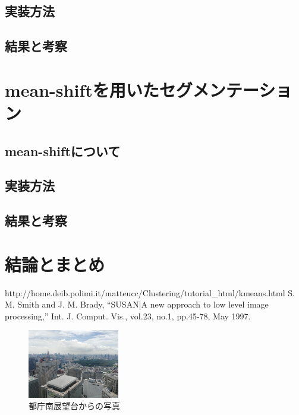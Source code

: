 \documentclass[11pt,a4j]{jsarticle}
\begin{document}
    \subsection{実装方法}
    \subsection{結果と考察}

    \section{mean-shiftを用いたセグメンテーション}
    \subsection{mean-shiftについて}
    \subsection{実装方法}
    \subsection{結果と考察}

    \section{結論とまとめ}

    \begin{thebibliography}{9}
         http://home.deib.polimi.it/matteucc/Clustering/tutorial_html/kmeans.html
         S. M. Smith and J. M. Brady,
          ``SUSAN|A new approach to low level image processing,'' Int. J. Comput.
          Vis., vol.23, no.1, pp.45-78, May 1997.
      \end{thebibliography}

    \begin{figure}[H]
      \centering
      \includegraphics[clip,width=4.0cm]{img/metro.jpg}
      \caption{都庁南展望台からの写真\label{fig:cute}}
    \end{figure}
\end{document}

